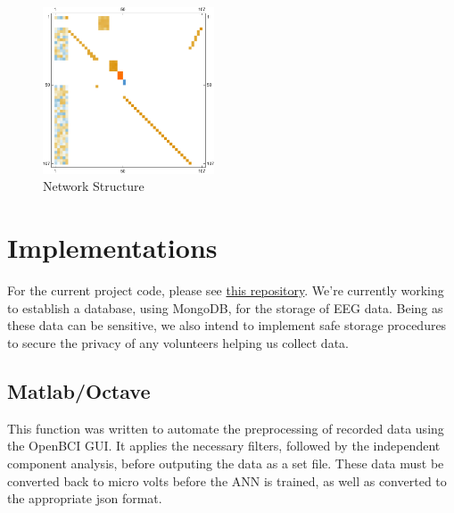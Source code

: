 \documentclass[twoside, 12pt]{article}
\theoremstyle{plain}
\begin{document}
\begin{figure}[ht]
  \centering
  \includegraphics[width=2in]{networkstruc.pdf}
  \caption{Network Structure}
  \label{fig:netstruc}
\end{figure}

\section{Implementations}
For the current project code, please see \href{https://github.com/mahn00b/openbci_testing_e}{this repository}. We're currently working to establish a database, using MongoDB, for the storage of EEG data. Being as these data can be sensitive, we also intend to implement safe storage procedures to secure the privacy of any volunteers helping us collect data.
\subsection{Matlab/Octave}
This function was written to automate the preprocessing of recorded data using the OpenBCI GUI. It applies the necessary filters, followed by the independent component analysis, before outputing the data as a set file. These data must be converted back to micro volts before the ANN is trained, as well as converted to the appropriate json format.

\end{document}
